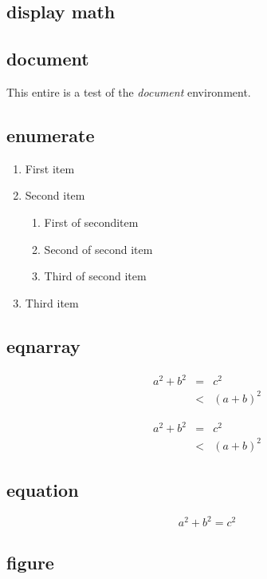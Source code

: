 \documentclass[11pt]{article}
\begin{document}
\subsection{display math}%

\subsection{document}
This entire  is a test of the \emph{document} environment.

\subsection{enumerate}
\begin{enumerate}
    \item First item
    \item Second item
        \begin{enumerate}
            \item First of seconditem
            \item Second of second item
            \item Third of second item
        \end{enumerate}

    \item Third item
\end{enumerate}

\subsection{eqnarray}
\begin{eqnarray}
    a^2+b^2 &=& c^2\\
    &<& (a+b)^2
\end{eqnarray}

\begin{eqnarray*}
    a^2+b^2 &=& c^2\\
    &<& (a+b)^2
\end{eqnarray*}

\subsection{equation}
\begin{equation}
    a^2+b^2 = c^2
\end{equation}

\subsection{figure}%
\end{document}
